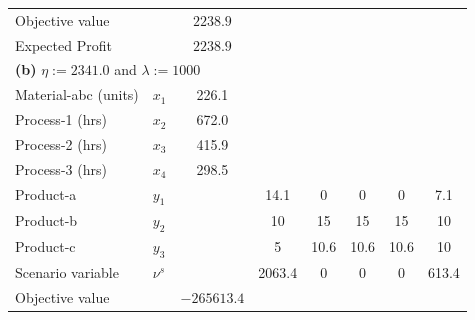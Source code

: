\documentclass[7pt]{article}
\begin{document}
\begin{table}[h!]
\begin{tabular}{ll|c|ccccc}
        Objective value       &                                            & $2238.9$        &                                                                                     \\
        Expected Profit       &                                            & $2238.9$        &                                                                                     \\
        \midrule
        \multicolumn{8}{l}{\textbf{(b)} $\eta := 2341.0$ and $\lambda := 1000$}                                                                                                    \\
        \midrule
        Material-abc (units)  & $x_1$                                      & 226.1           &              &                   &               &                  &               \\
        Process-1 (hrs)       & $x_2$                                      & 672.0           &              &                   &               &                  &               \\
        Process-2 (hrs)       & $x_3$                                      & 415.9           &              &                   &               &                  &               \\
        Process-3 (hrs)       & $x_4$                                      & 298.5           &              &                   &               &                  &               \\
        Product-a             & $y_1$                                      &                 & 14.1         & 0                 & 0             & 0                & 7.1           \\
        Product-b             & $y_2$                                      &                 & 10           & 15                & 15            & 15               & 10            \\
        Product-c             & $y_3$                                      &                 & 5            & 10.6              & 10.6          & 10.6             & 10            \\
        Scenario variable     & $\nu^s$                                    &                 & 2063.4       & 0                 & 0             & 0                & 613.4         \\
        Objective value       &                                            & $-265613.4$     &                                                                                     \\

\end{tabular}
\end{table}
\end{document}
